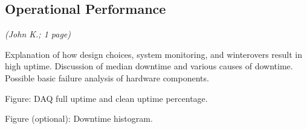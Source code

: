 \subsection{Operational Performance}
\textsl{(John K.; 1 page)}

Explanation of how design choices, system monitoring, and winterovers result in
high uptime.  Discussion of median downtime and various causes of downtime.
Possible basic failure analysis of hardware components.  

Figure: DAQ full uptime and clean uptime percentage.

Figure (optional): Downtime histogram.  
